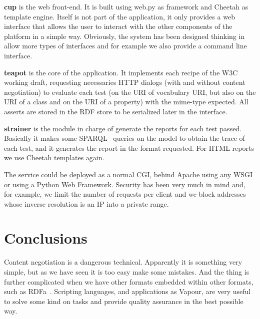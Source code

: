 \begin{description}

  \item \textbf{cup} is the web front-end. It is built using web.py as framework
        and Cheetah as template engine. Itself is not part of the application,
        it only provides a web interface that allows the user to interact with
        the other components of the platform in a simple way. Obviously, the
        system has been designed thinking in allow more types of interfaces
        and for example we also provide a command line interface.

  \item \textbf{teapot} is the core of the application. It implements each
        recipe of the W3C working draft, requesting necessaries HTTP dialogs 
        (with and without content negotiation) to evaluate each test (on the 
        URI of vocabulary URI, but also on the URI of a class and on the URI 
        of a property) with the mime-type expected. All asserts are stored in
        the RDF store to be serialized later in the interface.

  \item \textbf{strainer} is the module in charge of generate the reports for
        each test passed. Basically it makes some SPARQL~\cite{SPARQL} queries
        on the model to obtain the trace of each test, and it generates the
        report in the format requested. For HTML reports we use Cheetah templates
        again.

\end{description}

The service could be deployed as a normal CGI, behind Apache using any WSGI or
using a Python Web Framework. Security has been very much in mind and, for example, 
we limit the number of requests per client and we block addresses whose inverse 
resolution is an IP into a private range.

\section{\label{sec:conclusions}Conclusions}

Content negotiation is a dangerous technical. Apparently it is something very 
simple, but as we have seen it is too easy make some mistakes. And the thing is 
further complicated when we have other formats embedded within other formats,
such as RDFa~\cite{Birbeck2006}. Scripting languages, and applications as Vapour,
are very useful to solve some kind on tasks and provide quality assurance in 
the best possible way.

